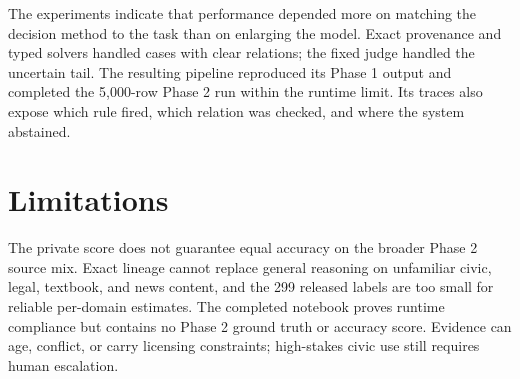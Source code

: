 \documentclass[11pt]{article}
\begin{document}
The experiments indicate that performance depended more on matching the decision method to the task than on enlarging the model. Exact provenance and typed solvers handled cases with clear relations; the fixed judge handled the uncertain tail. The resulting pipeline reproduced its Phase 1 output and completed the 5,000-row Phase 2 run within the runtime limit. Its traces also expose which rule fired, which relation was checked, and where the system abstained.

\section*{Limitations}

The private score does not guarantee equal accuracy on the broader Phase 2 source mix. Exact lineage cannot replace general reasoning on unfamiliar civic, legal, textbook, and news content, and the 299 released labels are too small for reliable per-domain estimates. The completed notebook proves runtime compliance but contains no Phase 2 ground truth or accuracy score. Evidence can age, conflict, or carry licensing constraints; high-stakes civic use still requires human escalation.

\clearpage

\end{document}
